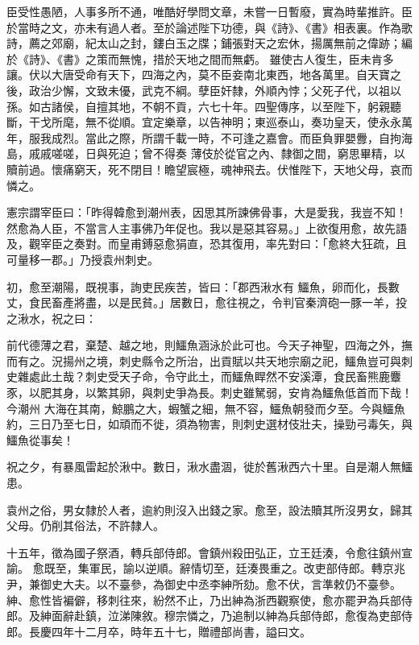 \begin{pinyinscope}
 臣受性愚陋，人事多所不通，唯酷好學問文章，未嘗一日暫廢，實為時輩推許。臣於當時之文，亦未有過人者。至於論述陛下功德，與《詩》、《書》相表裏。作為歌詩，薦之郊廟，紀太山之封，鏤白玉之牒；鋪張對天之宏休，揚厲無前之偉跡；編於《詩》、《書》之策而無愧，措於天地之間而無虧。
 雖使古人復生，臣未肯多讓。伏以大唐受命有天下，四海之內，莫不臣妾南北東西，地各萬里。自天寶之後，政治少懈，文致未優，武克不綱。孽臣奸隸，外順內悖；父死子代，以祖以孫。如古諸侯，自擅其地，不朝不貢，六七十年。四聖傳序，以至陛下，躬親聽斷，干戈所麾，無不從順。宜定樂章，以告神明；東巡泰山，奏功皇天，使永永萬年，服我成烈。當此之際，所謂千載一時，不可逢之嘉會。而臣負罪嬰釁，自拘海島，戚戚嗟嗟，日與死迫；曾不得奏
 薄伎於從官之內、隸御之間，窮思畢精，以贖前過。懷痛窮天，死不閉目！瞻望宸極，魂神飛去。伏惟陛下，天地父母，哀而憐之。



 憲宗謂宰臣曰：「昨得韓愈到潮州表，因思其所諫佛骨事，大是愛我，我豈不知！然愈為人臣，不當言人主事佛乃年促也。我以是惡其容易。」上欲復用愈，故先語及，觀宰臣之奏對。而皇甫鎛惡愈狷直，恐其復用，率先對曰：「愈終大狂疏，且可量移一郡。」乃授袁州刺史。



 初，愈至潮陽，既視事，詢吏民疾苦，皆曰：「郡西湫水有
 鱷魚，卵而化，長數丈，食民畜產將盡，以是民貧。」居數日，愈往視之，令判官秦濟砲一豚一羊，投之湫水，祝之曰：



 前代德薄之君，棄楚、越之地，則鱷魚涵泳於此可也。今天子神聖，四海之外，撫而有之。況揚州之境，刺史縣令之所治，出貢賦以共天地宗廟之祀，鱷魚豈可與刺史雜處此土哉？刺史受天子命，令守此土，而鱷魚睅然不安溪潭，食民畜熊鹿麞豕，以肥其身，以繁其卵，與刺史爭為長。刺史雖駑弱，安肯為鱷魚低首而下哉！今潮州
 大海在其南，鯨鵬之大，蝦蟹之細，無不容，鱷魚朝發而夕至。今與鱷魚約，三日乃至七日，如頑而不徙，須為物害，則刺史選材伎壯夫，操勁弓毒矢，與鱷魚從事矣！



 祝之夕，有暴風雷起於湫中。數日，湫水盡涸，徙於舊湫西六十里。自是潮人無鱷患。



 袁州之俗，男女隸於人者，逾約則沒入出錢之家。愈至，設法贖其所沒男女，歸其父母。仍削其俗法，不許隸人。



 十五年，徵為國子祭酒，轉兵部侍郎。會鎮州殺田弘正，立王廷湊，令愈往鎮州宣諭。
 愈既至，集軍民，諭以逆順。辭情切至，廷湊畏重之。改吏部侍郎。轉京兆尹，兼御史大夫。以不臺參，為御史中丞李紳所劾。愈不伏，言準敕仍不臺參。紳、愈性皆褊僻，移刺往來，紛然不止，乃出紳為浙西觀察使，愈亦罷尹為兵部侍郎。及紳面辭赴鎮，泣涕陳敘。穆宗憐之，乃追制以紳為兵部侍郎，愈復為吏部侍郎。長慶四年十二月卒，時年五十七，贈禮部尚書，謚曰文。




\end{pinyinscope}
